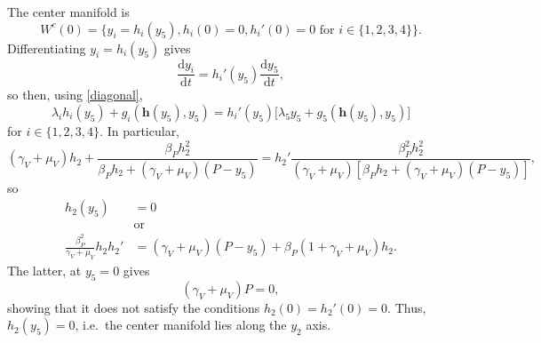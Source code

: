 \documentclass{article}
\newcommand{\md}{\mathrm{d}}
\renewcommand{\vec}[1]{\mathbf{#1}}
\begin{document}
The center manifold is
\begin{equation}
  W^c(0) = \big\{y_i = h_i(y_5), h_i(0) = 0, h_i'(0) = 0
  \text{ for $i \in \{1, 2, 3, 4\}$}\big\}.
\end{equation}
Differentiating $y_i = h_i(y_5)$ gives
\begin{equation}
  \frac{\md y_i}{\md t} = h_i'(y_5) \frac{\md y_5}{\md t},
\end{equation}
so then, using \eqref{diagonal},
\begin{equation}
  \lambda_i h_i(y_5) + g_i(\vec{h}(y_5), y_5)
  = h_i'(y_5) \big[\lambda_5 y_5 + g_5(\vec{h}(y_5), y_5)\big]
\end{equation}
for $i \in \{1, 2, 3, 4\}$.  In particular,
\begin{equation}
  (\gamma_V + \mu_V) h_2
  + \frac{\beta_P h_2^2}
  {\beta_P h_2 + (\gamma_V + \mu_V) (P - y_5)}
  = h_2'
  \frac{\beta_P^2 h_2^2}
  {(\gamma_V + \mu_V) [\beta_P h_2 + (\gamma_V + \mu_V) (P - y_5)]},
\end{equation}
so
\begin{equation}
  \begin{split}
    h_2(y_5) &= 0 \\
    &\text{or} \\
    \frac{\beta_P^2}{\gamma_V + \mu_V} h_2
    h_2'
    &=
    (\gamma_V + \mu_V) (P - y_5)
    + \beta_P (1 + \gamma_V + \mu_V) h_2.
  \end{split}
\end{equation}
The latter, at $y_5 = 0$ gives
\begin{equation}
  (\gamma_V + \mu_V) P = 0,
\end{equation}
showing that it does not satisfy the conditions
$h_2(0) = h_2'(0) = 0$.  Thus, $h_2(y_5) = 0$, i.e.~the center
manifold lies along the $y_2$ axis.
\end{document}
